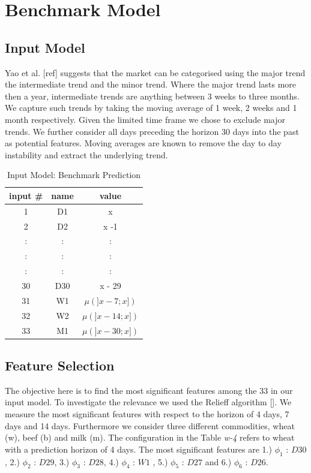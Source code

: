 \section{Benchmark Model}

\subsection{Input Model}

Yao et al. [ref] suggests that the market can be categorised using the major trend the intermediate trend and the minor trend. Where the major trend lasts more then a year, intermediate trends are anything between 3 weeks to three months. We capture such trends by taking the moving average of 1 week, 2 weeks and 1 month respectively. Given the limited time frame we chose to exclude major trends. We further consider all days preceding the horizon 30 days into the past as potential features. Moving averages are known to remove the day to day instability and extract the underlying trend.


\begin{table}
\centering
\begin{tabular}{ |c|c|c| } 

 input \# & name & value \\ 
  \hline
 1 & D1 & x \\ 
 2 & D2 & x -1 \\ 
 :& : & : \\ 
  :& : & : \\ 
  :& : & : \\ 
  30 & D30 & x - 29\\ 
  31 & W1 & $\mu(]x-7;x])$ \\ 
  32 & W2 & $\mu(]x-14;x])$ \\ 
  33 & M1 & $\mu(]x-30;x])$ \\ 
 

\end{tabular}
\caption{Input Model: Benchmark Prediction}
\label{tab:abc}
\end{table}


\subsection{Feature Selection}

The objective here is to find the most significant features among the 33 in our input model. To investigate the relevance we used the Relieff algorithm []. We measure the most significant features with respect to the horizon of 4 days, 7 days and 14 days. Furthermore we consider  three different commodities, wheat (w), beef (b) and milk (m). The configuration in the Table \emph{w-4} refers to wheat with a prediction horizon of 4 days. The most significant features are  1.) $\phi_1$ : $D30$ , 2.) $\phi_2$ : $D29$,  3.) $\phi_3$ : $D28$, 4.) $\phi_4$ : $W1$ , 5.) $\phi_5$ : $D27$ and 6.) $\phi_6$ : $D26$.

